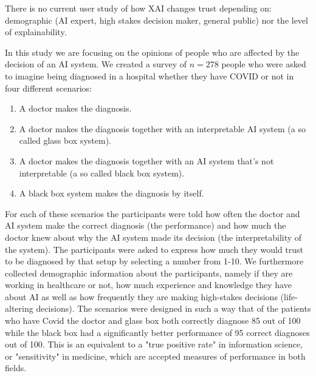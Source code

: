 \documentclass[manuscript,screen,review]{acmart}
\begin{document}
There is no current user study of how XAI changes trust depending on: demographic (AI expert, high stakes decision maker, general public) nor the level of explainability.  

In this study we are focusing on the opinions of people who are affected by the decision of an AI system. We created a survey of $n=278$ people who were asked to imagine being diagnosed in a hospital whether they have COVID or not in four different scenarios:

\begin{enumerate}
    \item A doctor makes the diagnosis.
    \item A doctor makes the diagnosis together with an interpretable AI system (a so called glass box system).
    \item A doctor makes the diagnosis together with an AI system that’s not interpretable (a so called black box system).
    \item A black box system makes the diagnosis by itself.
\end{enumerate}

For each of these scenarios the participants were told how often the doctor and AI system make the correct diagnosis (the performance) and how much the doctor knew about why the AI system made its decision (the interpretability of the system). The participants were asked to express how much they would trust to be diagnosed by that setup by selecting a number from 1-10. We furthermore collected demographic information about the participants, namely if they are working in healthcare or not, how much experience and knowledge they have about AI as well as how frequently they are making high-stakes decisions (life-altering decisions). The scenarios were designed in such a way that of the patients who have Covid the doctor and glass box both correctly diagnose 85 out of 100 while the black box had a significantly better performance of 95 correct diagnoses out of 100. This is an equivalent to a "true positive rate" in information science, or "sensitivity" in medicine, which are accepted measures of performance in both fields.
\end{document}
